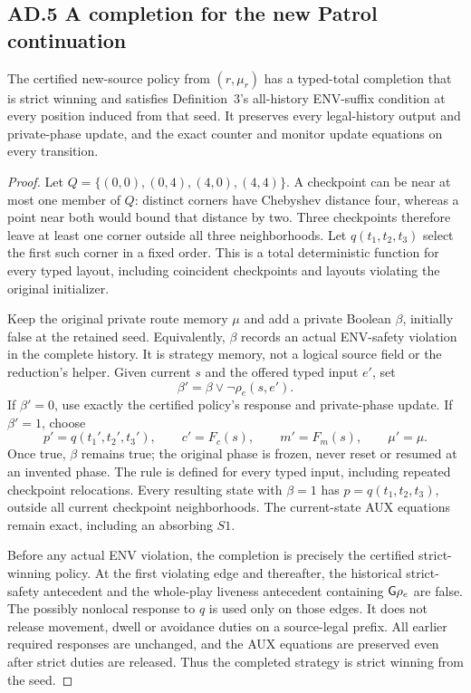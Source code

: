 \subsection*{AD.5 A completion for the new Patrol continuation}
\begin{lemma}
\label{supp:r7-patrol-kind-completion}
The certified new-source policy from $(r,\mu_r)$ has a typed-total
completion that is strict winning and satisfies Definition~3's all-history
ENV-suffix condition at every position induced from that seed.
It preserves every legal-history output and private-phase update, and the
exact counter and monitor update equations on every transition.
\end{lemma}
\begin{proof}
\begingroup{}
Let
$Q=\{(0,0),(0,4),(4,0),(4,4)\}$.
A checkpoint can be near at most one member of $Q$: distinct corners have
Chebyshev distance four, whereas a point near both would bound that distance
by two. Three checkpoints therefore leave at least one corner outside all
three neighborhoods. Let $q(t_1,t_2,t_3)$ select the first such corner in a
fixed order. This is a total deterministic function for every typed layout,
including coincident checkpoints and layouts violating the original initializer.
\par\endgroup

Keep the original private route memory $\mu$ and add a private Boolean
$\beta$, initially false at the retained seed. Equivalently, $\beta$ records
an actual ENV-safety violation in the complete history.
It is strategy memory, not a logical source field or the reduction's helper.
Given current $s$ and the offered typed input $e'$, set
\[
 \beta'=\beta\lor\neg\rho_e(s,e').
\]
If $\beta'=0$, use exactly the certified policy's response and private-phase
update. If $\beta'=1$, choose
\[
 p'=q(t_1',t_2',t_3'),\qquad
 c'=F_c(s),\qquad m'=F_m(s),\qquad \mu'=\mu .
\]
Once true, $\beta$ remains true; the original phase is frozen, never reset
or resumed at an invented phase. The rule is defined for every typed input,
including repeated checkpoint relocations. Every resulting state with
$\beta=1$ has $p=q(t_1,t_2,t_3)$, outside all current checkpoint neighborhoods.
The current-state AUX equations remain exact, including an absorbing $S1$.

Before any actual ENV violation, the completion is precisely the certified
strict-winning policy. At the first violating edge and thereafter, the
historical strict-safety antecedent and the whole-play liveness antecedent
containing $\mathsf{G}\rho_e$ are false. The possibly nonlocal response to $q$ is used
only on those edges. It does not release movement, dwell or avoidance duties
on a source-legal prefix. All earlier required responses are unchanged, and
the AUX equations are preserved even after strict duties are released.
Thus the completed strategy is strict winning from the seed.


\end{proof}
